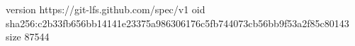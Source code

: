 version https://git-lfs.github.com/spec/v1
oid sha256:c2b33fb656bb14141e23375a986306176c5fb744073cb56bb9f53a2f85c80143
size 87544
